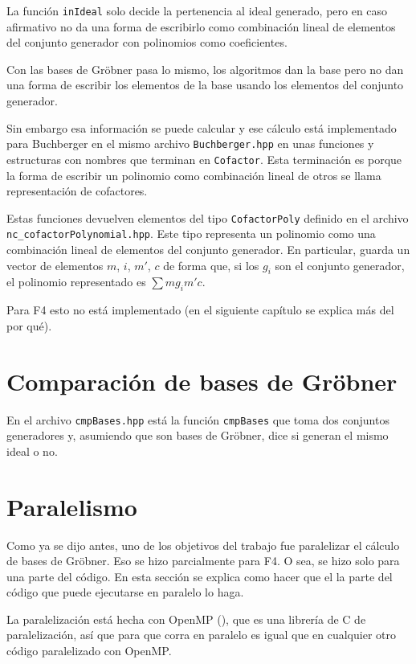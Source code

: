 \documentclass[12pt]{report}
\theoremstyle{customstyle}
\theoremstyle{factstyle}
\newcommand\cpp{C\nolinebreak[4]\hspace{-.05em}\raisebox{.4ex}{\relsize{-3}{\textbf{++}}}\xspace}
\begin{document}
La función \texttt{inIdeal} solo decide la pertenencia al ideal generado, pero en caso afirmativo no da una forma de escribirlo como combinación lineal de elementos del conjunto generador con polinomios como coeficientes.

Con las bases de Gröbner pasa lo mismo, los algoritmos dan la base pero no dan una forma de escribir los elementos de la base usando los elementos del conjunto generador.

Sin embargo esa información se puede calcular y ese cálculo está implementado para Buchberger en el mismo archivo \texttt{Buchberger.hpp} en unas funciones y estructuras con nombres que terminan en \texttt{Cofactor}. Esta terminación es porque la forma de escribir un polinomio como combinación lineal de otros se llama representación de cofactores.

Estas funciones devuelven elementos del tipo \texttt{CofactorPoly} definido en el archivo \texttt{nc\_cofactorPolynomial.hpp}. Este tipo representa un polinomio como una combinación lineal de elementos del conjunto generador. En particular, guarda un vector de elementos $m$, $i$, $m'$, $c$ de forma que, si los $g_i$ son el conjunto generador, el polinomio representado es $∑ m g_i m' c$.

Para F4 esto no está implementado (en el siguiente capítulo se explica más del por qué).


\section{Comparación de bases de Gröbner}\label{section:Comparación de bases de Gröbner (libreria)}

En el archivo \texttt{cmpBases.hpp} está la función \texttt{cmpBases} que toma dos conjuntos generadores y, asumiendo que son bases de Gröbner, dice si generan el mismo ideal o no.

\section{Paralelismo} %

Como ya se dijo antes, uno de los objetivos del trabajo fue paralelizar el cálculo de bases de Gröbner. Eso se hizo parcialmente para F4. O sea, se hizo solo para una parte del código. En esta sección se explica como hacer que el la parte del código que puede ejecutarse en paralelo lo haga.

La paralelización está hecha con OpenMP (\cite{lib:openmp}), que es una librería de \cpp de paralelización, así que para que corra en paralelo es igual que en cualquier otro código paralelizado con OpenMP.
\end{document}

